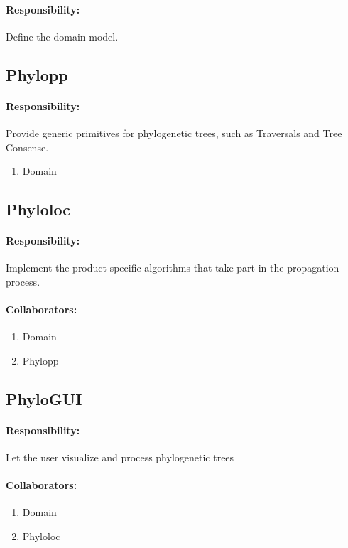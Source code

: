 \documentclass[a4paper,10pt]{article}
\begin{document}
\paragraph{Responsibility:} Define the domain model.

\subsection{Phylopp}

\paragraph{Responsibility:} Provide generic primitives for phylogenetic trees, such as Traversals and Tree Consense.
\begin{enumerate}
       \item Domain
      \end{enumerate}
	  
\subsection{Phyloloc}

\paragraph{Responsibility:} Implement the product-specific algorithms that take part in the propagation process.
\paragraph{Collaborators:}
      \begin{enumerate}
       \item Domain
	   \item Phylopp
      \end{enumerate}
	  
\subsection{PhyloGUI}

\paragraph{Responsibility:} Let the user visualize and process phylogenetic trees
\paragraph{Collaborators:}
      \begin{enumerate}
       \item Domain
	   \item Phyloloc
      \end{enumerate}
	  
\end{document}
